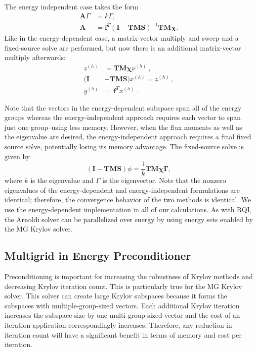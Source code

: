 \documentclass{article}                                                                           %
\begin{document}
The energy independent case takes the form
\begin{equation}
\begin{split}
\mathbf{A}\Gamma &= k\Gamma, \\
\mathbf{A} &= \mathbf{f}^T(\mathbf{I - TMS})^{-1}\mathbf{TM\chi}.
\end{split}
\end{equation}
Like in the energy-dependent case, a matrix-vector multiply and sweep and a fixed-source solve are performed, but now there is an additional matrix-vector multiply afterwards:
\begin{align}
z^{(h)} &= \mathbf{TM\chi}\nu^{(h)}\:,\\
%
(\mathbf{I} &- \mathbf{TMS})x^{(h)} = z^{(h)}\:,\\
%
y^{(h)} &= \mathbf{f}^Tx^{(h)}\:.
\end{align}

Note that the vectors in the energy-dependent subspace span all of the energy groups whereas the energy-independent approach requires each vector to span just one group--using less memory. However, when the flux moments as well as the eigenvalue are desired, the energy-independent approach requires a final fixed source solve, potentially losing its memory advantage. The fixed-source solve is given by
\begin{equation}
(\mathbf{I} - \mathbf{TMS})\phi = \frac{1}{k}\mathbf{TM\chi\Gamma},
\end{equation}
where $k$ is the eigenvalue and $\Gamma$ is the eigenvector. Note that the nonzero eigenvalues of the energy-dependent and energy-independent formulations are identical; therefore, the convergence behavior of the two methods is identical.  We use the energy-dependent implementation in all of our calculations. As with RQI, the Arnoldi solver can be parallelized over energy by using energy sets enabled by the MG Krylov solver.


\subsection{Multigrid in Energy Preconditioner}
\label{sec:precond}
Preconditioning is important for increasing the robustness of Krylov methods and decreasing Krylov iteration count. This is particularly true for the MG Krylov solver. This solver can create large Krylov subspaces because it forms the subspaces with multiple-group-sized vectors. 
Each additional Krylov iteration increases the subspace size by one multi-group-sized vector and the cost of an iteration application correspondingly increases. 
Therefore, any reduction in iteration count will have a significant benefit in terms of memory and cost per iteration. 
 
\end{document}

